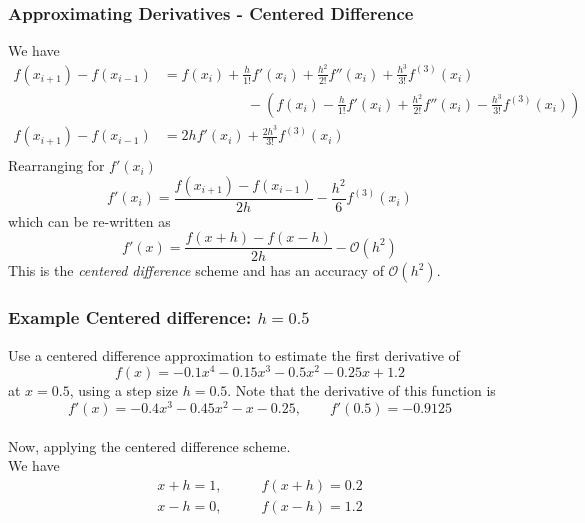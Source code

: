 \documentclass{if-beamer}
\begin{document}
\begin{frame}
	\frametitle{Approximating Derivatives - Centered Difference}
	We have
	\begin{align*}
		f(x_{i+1}) - f(x_{i-1}) &= f(x_i) +\frac{h}{1!}f'(x_i) + \frac{h^2}{2!}f''(x_i) + \frac{h^3}{3!}f^{(3)}(x_i)\\
		&  \qquad \qquad \qquad-\left(f(x_i) -\frac{h}{1!}f'(x_i) + \frac{h^2}{2!}f''(x_i)-\frac{h^3}{3!}f^{(3)}(x_i)\right)\\
		f(x_{i+1}) - f(x_{i-1}) &= 2hf'(x_i)+\frac{2h^3}{3!}f^{(3)}(x_i)\\
	\end{align*}
	Rearranging for $f'(x_i)$
	$$f'(x_i) = \frac{f(x_{i+1})-f(x_{i-1})}{2h} -\frac{h^2}{6}f^{(3)}(x_i)$$
	which can be re-written as
	$$f'(x) = \frac{f(x+h)-f(x-h)}{2h} -\mathcal{O}(h^2)$$
	This is the \textit{centered difference} scheme and has an accuracy of $\mathcal{O}(h^2)$.
\end{frame}
\begin{frame}
	\frametitle{Example Centered difference: $h= 0.5$}
	Use a centered difference approximation to estimate the first derivative of
	$$f(x) = -0.1x^4-0.15x^3-0.5x^2-0.25x+1.2 $$
	at $x=0.5$, using a step size $h = 0.5$. Note that the derivative of this function is
	$$f'(x) = -0.4x^3-0.45x^2-x-0.25, \qquad f'(0.5) = -0.9125$$
	\\\vspace{5pt}
	Now, applying the centered difference scheme.\\\vspace{5pt}
	We have
	\begin{align*}
		x+h = 1, \qquad &f(x+h) = 0.2\\
		x-h = 0, \qquad &f(x-h) = 1.2\\
	\end{align*}
\end{frame}
\end{document}
